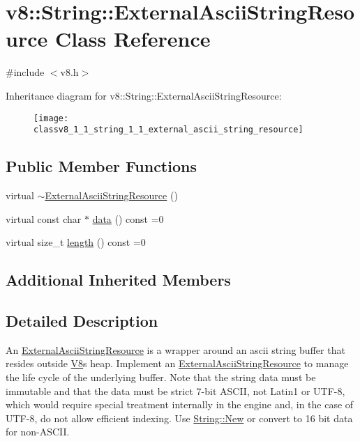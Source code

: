 \hypertarget{classv8_1_1_string_1_1_external_ascii_string_resource}{}\section{v8\+:\+:String\+:\+:External\+Ascii\+String\+Resource Class Reference}
\label{classv8_1_1_string_1_1_external_ascii_string_resource}


{\ttfamily \#include $<$v8.\+h$>$}

Inheritance diagram for v8\+:\+:String\+:\+:External\+Ascii\+String\+Resource\+:\begin{figure}[H]
\begin{center}
\leavevmode
\texttt{[image: classv8\_1\_1\_string\_1\_1\_external\_ascii\_string\_resource]}
\end{center}
\end{figure}
\subsection*{Public Member Functions}
\begin{DoxyCompactItemize}
\item 
virtual \hyperlink{classv8_1_1_string_1_1_external_ascii_string_resource_acd8790ae14be1b90794b363d24a147d0}{$\sim$\+External\+Ascii\+String\+Resource} ()
\item 
virtual const char $\ast$ \hyperlink{classv8_1_1_string_1_1_external_ascii_string_resource_adeb99e8c8c630e2dac5ad76476249d2f}{data} () const =0
\item 
virtual size\+\_\+t \hyperlink{classv8_1_1_string_1_1_external_ascii_string_resource_aeecccc52434c2057d3dc5c9732458a8e}{length} () const =0
\end{DoxyCompactItemize}
\subsection*{Additional Inherited Members}


\subsection{Detailed Description}
An \hyperlink{classv8_1_1_string_1_1_external_ascii_string_resource}{External\+Ascii\+String\+Resource} is a wrapper around an ascii string buffer that resides outside \hyperlink{classv8_1_1_v8}{V8}\textquotesingle{}s heap. Implement an \hyperlink{classv8_1_1_string_1_1_external_ascii_string_resource}{External\+Ascii\+String\+Resource} to manage the life cycle of the underlying buffer. Note that the string data must be immutable and that the data must be strict 7-\/bit A\+S\+C\+I\+I, not Latin1 or U\+T\+F-\/8, which would require special treatment internally in the engine and, in the case of U\+T\+F-\/8, do not allow efficient indexing. Use \hyperlink{classv8_1_1_string_a66188e5be9378cad8cbf953053de86bc}{String\+::\+New} or convert to 16 bit data for non-\/\+A\+S\+C\+I\+I. 

